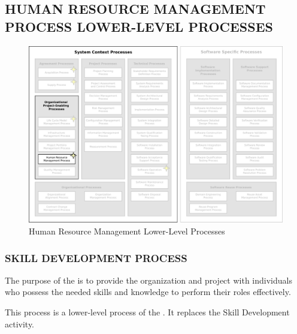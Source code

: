 	\subsection{HUMAN RESOURCE MANAGEMENT PROCESS LOWER-LEVEL PROCESSES\label{llsubsec:human_resource_management_processes}}
	\begin{figure}[h]
		\centering
		\includegraphics[width=15cm,keepaspectratio]{figures/life-cycle-process-groups-lower-level-human-resource-management-processes.pdf}
		\caption{Human Resource Management Lower-Level Processes}
		\label{fig:lower_level_human_resource_management_processes}
	\end{figure}

		\subsubsection{SKILL DEVELOPMENT PROCESS\label{llproc:skill_development_process}}

			\begin{adjustwidth}{2em}{0pt} 

				The purpose of the  is to provide the organization and project with individuals who possess the needed skills and knowledge to perform their roles effectively.

				This process is a lower-level process of the . It replaces the Skill Development activity.

			\end{adjustwidth}

